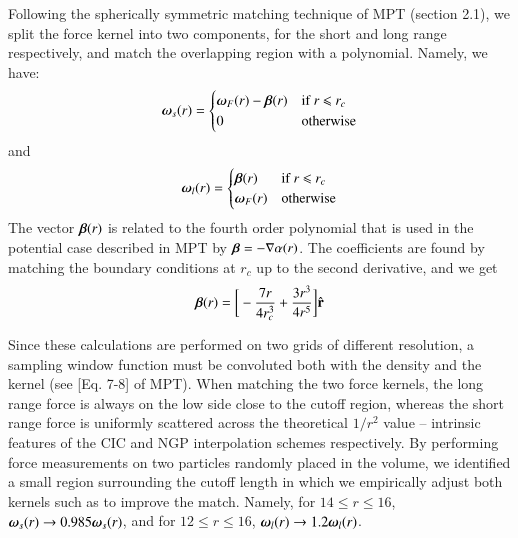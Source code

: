 Following the spherically symmetric matching technique of MPT (section 2.1), 
we split  the force kernel into two components, for the short and long range respectively, and 
match the overlapping region with a polynomial. Namely, we have:
\begin{eqnarray}
\mbox{\boldmath $\omega$}_{s}(r) = \begin{cases} \mbox{\boldmath $\omega$}_{F}(r) -  \mbox{\boldmath $\beta$}(r) &\mbox{if  } \mbox{$r$ $\le$ $r_{c}$ } \\
0 & \mbox{otherwise} 
\end{cases}
\end{eqnarray}
and
\begin{eqnarray}
\mbox{\boldmath $\omega$}_{l}(r) = \begin{cases} \mbox{\boldmath $\beta$}(r) &\mbox{if  } \mbox{$r$ $\le$ $r_{c}$ } \\
 \mbox{\boldmath $\omega$}_{F}(r)  &\mbox{otherwise} 
\end{cases}
\end{eqnarray}
The vector $\mbox{\boldmath $\beta$}(r)$ is related to the fourth order polynomial that is used in the potential case described in MPT by
 $ \mbox{\boldmath $\beta$} = - {\bf \nabla} \alpha(r)$. The coefficients are found by matching the boundary conditions at $r_{c}$ up to the second derivative,
 and we get
  \begin{eqnarray}
   \mbox{\boldmath $\beta$}(r) = \bigg[ -\frac{7 r}{4 r_{c}^{3}} + \frac{3 r^{3}}{4 r^{5}}\bigg] \hat{\bf r}
  \end{eqnarray}

Since these calculations are performed on two grids of different resolution, a sampling window function must be convoluted 
both with the density and the kernel (see [Eq. 7-8] of MPT).
When matching the two force kernels, the long range force is always on the low side close to the cutoff region, whereas the short range force is uniformly scattered across the theoretical $1/r^2$ value -- intrinsic features of the CIC and NGP interpolation schemes respectively.  By performing force measurements on two particles randomly placed in the volume, we identified a small region surrounding the cutoff length in which we empirically adjust both kernels such as to improve the match. Namely, for $14 \le r \le 16$, $\mbox{\boldmath $\omega$}_{s}({r}) \rightarrow 0.985\mbox{\boldmath $\omega$}_{s}({ r})$,
and for  $12 \le r \le 16$, $\mbox{\boldmath $\omega$}_{l}({r}) \rightarrow 1.2\mbox{\boldmath $\omega$}_{l}({ r})$.

